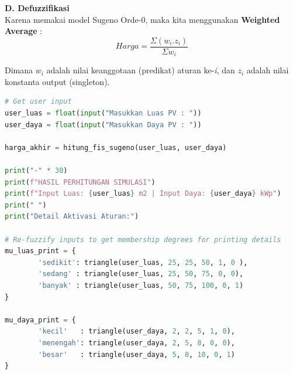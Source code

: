 \documentclass{article}
\begin{document}
\textbf{D. Defuzzifikasi}\\
Karena memakai model Sugeno Orde-0, maka kita menggunakan \textbf{Weighted Average} : \\
\[
        Harga = \frac{\Sigma (w_{i} . z_{i})}{\Sigma w_{i}}
\]

Dimana $w_{i}$ adalah nilai keanggotaan (predikat) aturan ke-\textit{i}, dan $z_{i}$ adalah nilai konstanta output (singleton).

\begin{lstlisting}[caption=Menampilkan Hasil Perhitungan, language=Python]
# Get user input
user_luas = float(input("Masukkan Luas PV : "))
user_daya = float(input("Masukkan Daya PV : "))

harga_akhir = hitung_fis_sugeno(user_luas, user_daya)

print("-" * 30)
print(f"HASIL PERHITUNGAN SIMULASI")
print(f"Input Luas: {user_luas} m2 | Input Daya: {user_daya} kWp")
print(" ")
print("Detail Aktivasi Aturan:")

# Re-fuzzify inputs to get membership degrees for printing details
mu_luas_print = {
        'sedikit': triangle(user_luas, 25, 25, 50, 1, 0 ),
        'sedang' : triangle(user_luas, 25, 50, 75, 0, 0),
        'banyak' : triangle(user_luas, 50, 75, 100, 0, 1)
}

mu_daya_print = {
        'kecil'   : triangle(user_daya, 2, 2, 5, 1, 0),
        'menengah': triangle(user_daya, 2, 5, 8, 0, 0),
        'besar'   : triangle(user_daya, 5, 8, 10, 0, 1)
}
\end{lstlisting}
\end{document}

